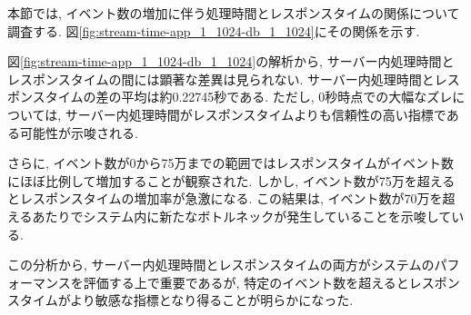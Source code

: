 \documentclass[../../../../../main]{subfiles}
\begin{document}
    \label{subsubsec:result-streaming-only-limit-time}

    本節では, イベント数の増加に伴う処理時間とレスポンスタイムの関係について調査する. 図\ref{fig:stream-time-app_1_1024-db_1_1024}にその関係を示す.

    

    図\ref{fig:stream-time-app_1_1024-db_1_1024}の解析から, サーバー内処理時間とレスポンスタイムの間には顕著な差異は見られない. サーバー内処理時間とレスポンスタイムの差の平均は約0.22745秒である. ただし, 0秒時点での大幅なズレについては, サーバー内処理時間がレスポンスタイムよりも信頼性の高い指標である可能性が示唆される.

    さらに, イベント数が0から75万までの範囲ではレスポンスタイムがイベント数にほぼ比例して増加することが観察された. しかし, イベント数が75万を超えるとレスポンスタイムの増加率が急激になる. この結果は, イベント数が70万を超えるあたりでシステム内に新たなボトルネックが発生していることを示唆している.

    この分析から, サーバー内処理時間とレスポンスタイムの両方がシステムのパフォーマンスを評価する上で重要であるが, 特定のイベント数を超えるとレスポンスタイムがより敏感な指標となり得ることが明らかになった.
\end{document}
